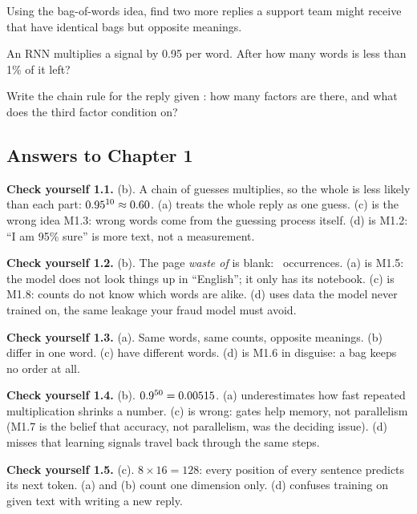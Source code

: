 \begin{exercise}
Using the bag-of-words idea, find two more replies a support team might receive that have identical bags but
opposite meanings.
\end{exercise}

\begin{exercise}
An RNN multiplies a signal by 0.95 per word. After how many words is less than 1\% of it left?
\end{exercise}

\begin{exercise}
Write the chain rule for the reply  given : how many
factors are there, and what does the third factor condition on?
\end{exercise}

\subsection*{Answers to Chapter 1}
\small
\textbf{Check yourself 1.1.} (b). A chain of guesses multiplies, so the whole is less likely than each part:
$0.95^{10}\approx0.60$. (a) treats the whole reply as one guess. (c) is the wrong idea M1.3: wrong words come
from the guessing process itself. (d) is M1.2: ``I am 95\% sure'' is more text, not a measurement.

\textbf{Check yourself 1.2.} (b). The page \emph{waste of} is blank: \cWasteOfTrain\ occurrences. (a) is M1.5:
the model does not look things up in ``English''; it only has its notebook. (c) is M1.8: counts do not know
which words are alike. (d) uses data the model never trained on, the same leakage your fraud model must avoid.

\textbf{Check yourself 1.3.} (a). Same words, same counts, opposite meanings. (b) differ in one word. (c) have
different words. (d) is M1.6 in disguise: a bag keeps no order at all.

\textbf{Check yourself 1.4.} (b). $0.9^{50}=0.00515$. (a) underestimates how fast repeated multiplication
shrinks a number. (c) is wrong: gates help memory, not parallelism (M1.7 is the belief that accuracy, not
parallelism, was the deciding issue). (d) misses that learning signals travel back through the same steps.

\textbf{Check yourself 1.5.} (c). $8\times16=128$: every position of every sentence predicts its next token. (a)
and (b) count one dimension only. (d) confuses training on given text with writing a new reply.

